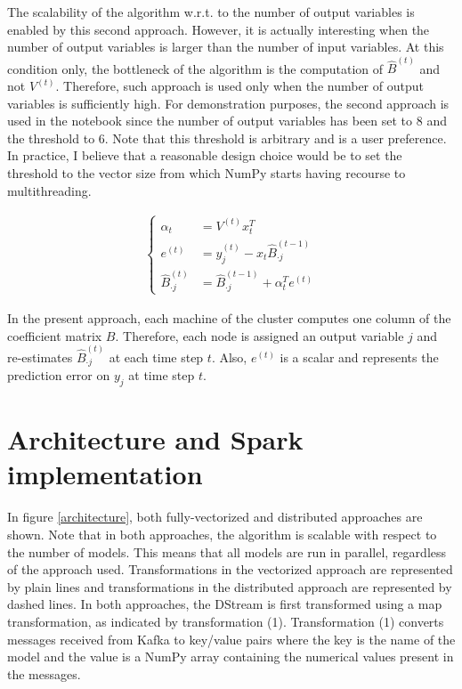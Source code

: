 The scalability of the algorithm w.r.t. to the number of output variables
is enabled by this second approach. However, it is actually interesting
when the number of output variables is larger than the number of input
variables. At this condition only, the bottleneck of the algorithm
is the computation of $\hat{B}^{(t)}$ and not $V^{(t)}$.
Therefore, such approach is used only when the number of output variables
is sufficiently high. For demonstration purposes, the second approach
is used in the notebook since the number of output variables has been
set to $8$ and the threshold to $6$. Note that this threshold is arbitrary
and is a user preference. In practice, I believe that a reasonable design choice
would be to set the threshold to the vector size from which NumPy starts having
recourse to multithreading.

\begin{align}
\begin{cases}
    \alpha_t & = V^{(t)} x_t^T \\
    e^{(t)} & = y_j^{(t)} - x_t \hat{B}_{\cdot j}^{(t-1)} \\
    \hat{B}_{\cdot j}^{(t)} & = \hat{B}_{\cdot j}^{(t-1)} + \alpha_t^T e^{(t)}
\end{cases}
\end{align}

In the present approach, each machine of the cluster computes one column
of the coefficient matrix $B$. Therefore, each node is assigned an output
variable $j$ and re-estimates $\hat{B}_{\cdot j}^{(t)}$ at each time step $t$.
Also, $e^{(t)}$ is a scalar and represents the prediction error on $y_j$ at time step $t$.


\section{Architecture and Spark implementation}

In figure \ref{architecture}, both fully-vectorized and distributed approaches are shown.
Note that in both approaches, the algorithm is scalable with respect to the number of models.
This means that all models are run in parallel, regardless of the approach used.
Transformations in the vectorized approach are
represented by plain lines and transformations in the distributed approach are represented by dashed lines.
In both approaches, the DStream is first transformed using a map transformation, as indicated by transformation (1).
Transformation (1) converts messages received from Kafka to key/value pairs where the key is the name of the model
and the value is a NumPy array containing the numerical values present in the messages.

